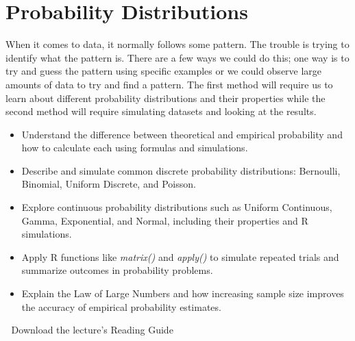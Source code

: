 \documentclass[
  letterpaper,
  DIV=11,
  numbers=noendperiod]{scrreprt}
\providecommand{\tightlist}{%
  \setlength{\itemsep}{0pt}\setlength{\parskip}{0pt}}
\begin{document}

\chapter{Probability Distributions}\label{probability-distributions}

When it comes to data, it normally follows some pattern. The trouble is
trying to identify what the pattern is. There are a few ways we could do
this; one way is to try and guess the pattern using specific examples or
we could observe large amounts of data to try and find a pattern. The
first method will require us to learn about different probability
distributions and their properties while the second method will require
simulating datasets and looking at the results.

\begin{itemize}
\tightlist
\item
  Understand the difference between theoretical and empirical
  probability and how to calculate each using formulas and
  simulations.\\
\item
  Describe and simulate common discrete probability distributions:
  Bernoulli, Binomial, Uniform Discrete, and Poisson.\\
\item
  Explore continuous probability distributions such as Uniform
  Continuous, Gamma, Exponential, and Normal, including their properties
  and R simulations.\\
\item
  Apply R functions like \emph{matrix()} and \emph{apply()} to simulate
  repeated trials and summarize outcomes in probability problems.\\
\item
  Explain the Law of Large Numbers and how increasing sample size
  improves the accuracy of empirical probability estimates.
\end{itemize}

\begin{tcolorbox}[enhanced jigsaw, leftrule=.75mm, arc=.35mm, coltitle=black, rightrule=.15mm, bottomrule=.15mm, toprule=.15mm, left=2mm, colbacktitle=quarto-callout-tip-color!10!white, title=\textcolor{quarto-callout-tip-color}{\faLightbulb}\hspace{0.5em}{Supplemental Material}, toptitle=1mm, breakable, colframe=quarto-callout-tip-color-frame, bottomtitle=1mm, titlerule=0mm, colback=white, opacityback=0, opacitybacktitle=0.6]

📄 Download the lecture's Reading Guide

\end{tcolorbox}
\end{document}
